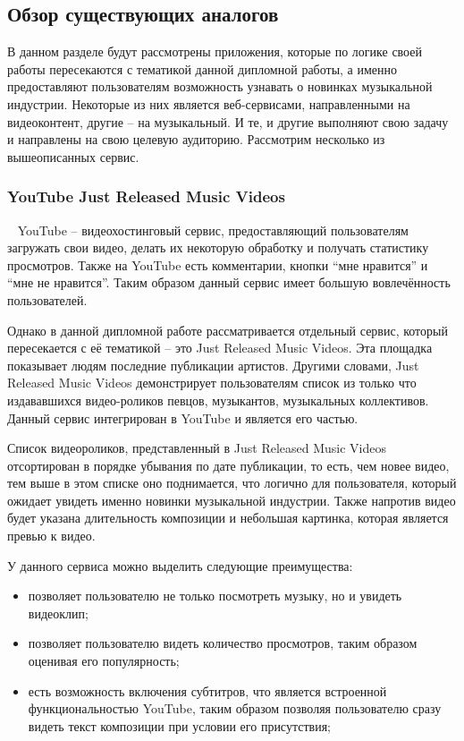 \subsection{Обзор существующих аналогов}
\label{sub:domain:analogues_review}
В данном разделе будут рассмотрены приложения, которые по логике своей работы пересекаются с тематикой данной дипломной работы, а именно предоставляют пользователям возможность узнавать о новинках музыкальной индустрии. Некоторые из них является веб-сервисами, направленными на видеоконтент, другие -- на музыкальный. И те, и другие выполняют свою задачу и направлены на свою целевую аудиторию. Рассмотрим несколько из вышеописанных сервис.

\subsubsection{YouTube Just Released Music Videos}
\label{sub:domain:analogues_review:youtube}
~\newline
\indent YouTube -- видеохостинговый сервис, предоставляющий пользователям загружать свои видео, делать их некоторую обработку и получать статистику просмотров. Также на YouTube есть комментарии, кнопки “мне нравится” и “мне не нравится”. Таким образом данный сервис имеет большую вовлечённость пользователей.

Однако в данной дипломной работе рассматривается отдельный сервис, который пересекается с её тематикой -- это Just Released Music Videos. Эта площадка показывает людям последние публикации артистов. Другими словами, Just Released Music Videos демонстрирует пользователям список из только что издававшихся видео-роликов певцов, музыкантов, музыкальных коллективов. Данный сервис интегрирован в YouTube и является его частью.

Список видеороликов, представленный в Just Released Music Videos отсортирован в порядке убывания по дате публикации, то есть, чем новее видео, тем выше в этом списке оно поднимается, что логично для пользователя, который ожидает увидеть именно новинки музыкальной индустрии. Также напротив видео будет указана длительность композиции и небольшая картинка, которая является превью к видео.

У данного сервиса можно выделить следующие преимущества:

\begin{itemize}
  \item позволяет пользователю не только посмотреть музыку, но и увидеть видеоклип;
  \item позволяет пользователю видеть количество просмотров, таким образом оценивая его популярность;
  \item есть возможность включения субтитров, что является встроенной функциональностью YouTube, таким образом позволяя пользователю сразу видеть текст композиции при условии его присутствия;
\end{itemize}

